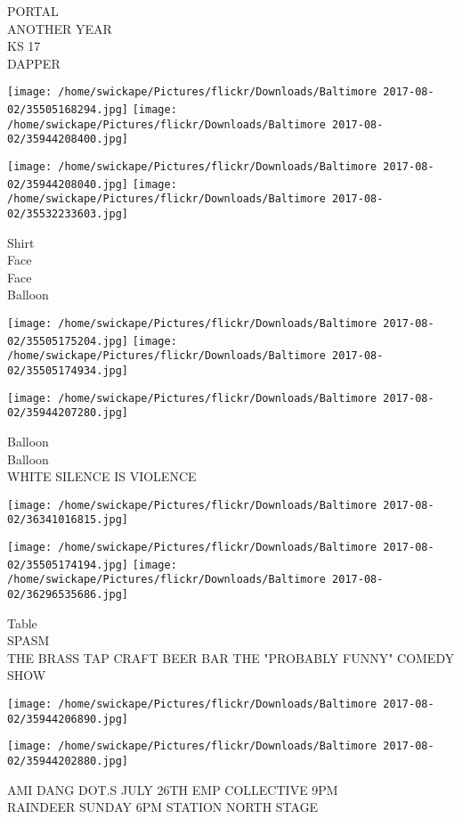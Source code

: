 \documentclass[10pt,letterpaper]{article}
\begin{document}
PORTAL\\
ANOTHER YEAR\\
KS 17\\
DAPPER
\pagebreak

\texttt{[image: /home/swickape/Pictures/flickr/Downloads/Baltimore 2017-08-02/35505168294.jpg]}
\texttt{[image: /home/swickape/Pictures/flickr/Downloads/Baltimore 2017-08-02/35944208400.jpg]}

\texttt{[image: /home/swickape/Pictures/flickr/Downloads/Baltimore 2017-08-02/35944208040.jpg]}
\texttt{[image: /home/swickape/Pictures/flickr/Downloads/Baltimore 2017-08-02/35532233603.jpg]}

Shirt\\
Face\\
Face\\
Balloon
\pagebreak

\texttt{[image: /home/swickape/Pictures/flickr/Downloads/Baltimore 2017-08-02/35505175204.jpg]}
\texttt{[image: /home/swickape/Pictures/flickr/Downloads/Baltimore 2017-08-02/35505174934.jpg]}

\texttt{[image: /home/swickape/Pictures/flickr/Downloads/Baltimore 2017-08-02/35944207280.jpg]}

Balloon\\
Balloon\\
WHITE SILENCE IS VIOLENCE
\pagebreak

\texttt{[image: /home/swickape/Pictures/flickr/Downloads/Baltimore 2017-08-02/36341016815.jpg]}

\vspace{0.25in}
\texttt{[image: /home/swickape/Pictures/flickr/Downloads/Baltimore 2017-08-02/35505174194.jpg]}
\texttt{[image: /home/swickape/Pictures/flickr/Downloads/Baltimore 2017-08-02/36296535686.jpg]}

Table\\
SPASM\\
THE BRASS TAP CRAFT BEER BAR THE "PROBABLY FUNNY" COMEDY SHOW
\pagebreak

\texttt{[image: /home/swickape/Pictures/flickr/Downloads/Baltimore 2017-08-02/35944206890.jpg]}

\vspace{0.25in}
\texttt{[image: /home/swickape/Pictures/flickr/Downloads/Baltimore 2017-08-02/35944202880.jpg]}

AMI DANG DOT.S JULY 26TH EMP COLLECTIVE 9PM\\
RAINDEER SUNDAY 6PM STATION NORTH STAGE
\pagebreak
\end{document}
